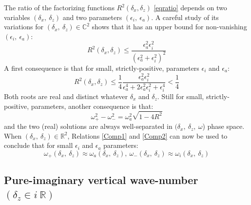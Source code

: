 \documentclass[a4paper,11pt]{article}
\begin{document}
The ratio of the factorizing functions $\displaystyle R^2(\delta_x,\delta_z)$ \ref{eqratio} depends on two variables $(\delta_x,\ \delta_z)$ and two parameters $(\epsilon_i,\ \epsilon_a)$. A careful study of its variations for $(\delta_x,\ \delta_z)\in \mathbb{C}^2$ shows that it has an upper bound for non-vanishing $(\epsilon_i,\ \epsilon_a)$:
\begin{equation}
	 R^2(\delta_x,\delta_z) \leq
	\frac{\epsilon_a^2\epsilon_i^2}{\left
	(\epsilon_a^2+\epsilon_i^2
	\right)^2}
\end{equation}
A first consequence is that for small, strictly-positive, parameters $\epsilon_i$ and $\epsilon_a$:
\begin{equation}
	 R^2(\delta_x,\delta_z) 
	\leq
	\frac{1}{4}
	\frac{\epsilon_a^2\epsilon_i^2}{\epsilon_a^4+2\epsilon_a^2\epsilon_i^2+\epsilon_i^4} 
	<
	\frac{1}{4}
\end{equation}
Both roots are real and distinct whatever $\delta_x$ and $\delta_z$. Still for small, strictly-positive, parameters, another consequence is that:
\begin{equation}
    \omega_{+}^2-\omega_{-}^2 =\omega_a^2\sqrt{1-4 R^2}
	\label{deltaomegapm}
\end{equation}
and the two (real) solutions are always well-separated in $(\delta_x,\ \delta_z,\ \omega$) phase space.\\
When $(\delta_x,\ \delta_z)\in \mathbb{R}^2$, Relations \ref{Comp1} and \ref{Comp2} can now be used to conclude that for small $\epsilon_i$ and $\epsilon_a$ parameters:
\begin{equation}
	\omega_{+}(\delta_x,\ \delta_z) \approx \omega_a(\delta_x,\ \delta_z),\ 
	\omega_{-}(\delta_x,\ \delta_z) \approx \omega_i
	(\delta_x,\ \delta_z)
\end{equation}

\subsection{Pure-imaginary vertical wave-number $(\delta_z\in i\ 
\mathbb{R})$}
\label{subsubsectioniR}
\end{document}
